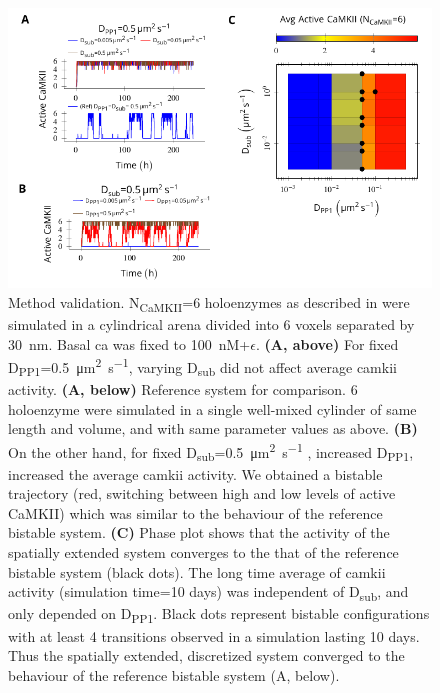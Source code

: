 \documentclass[9pt,lineno,doublespacing]{elife}
\newcommand\SUB[2]{#1\textsubscript{#2}}
\begin{document}
\begin{figure}[ht!]
    \includegraphics[width=12cm]{./PaperFigures/elifeFigure7/figure_su_long_term_effect.pdf}
    \caption{Method validation. \SUB{N}{CaMKII}=6 holoenzymes as described in
         were simulated in a cylindrical arena 
        divided into 6 voxels separated by \SI{30}{\nano\meter}. Basal \gls{ca} 
        was fixed to \SI{100}{\nano M}+$\epsilon$.  
        \textbf{(A, above)} For fixed 
        \SUB{D}{PP1}=\SI{0.5}{\micro\meter\squared\per\second}, varying
        \SUB{D}{sub} did not affect average \gls{camkii} activity. 
        \textbf{(A, below)} Reference system for comparison. 6 holoenzyme 
        were simulated in a single well-mixed cylinder of same length 
        and volume, and with same parameter values as above.
        \textbf{(B)} On the other hand, for fixed
        \SUB{D}{sub}=\SI{0.5}{\micro\meter\squared\per\second} , increased
        \SUB{D}{PP1}, increased the average \gls{camkii} activity. We obtained 
        a bistable trajectory (red, switching between high and low levels of 
        active CaMKII) which was similar to the behaviour of the reference bistable
        system. 
        \textbf{(C)} Phase plot shows that the activity of the spatially extended 
        system converges to the that of the reference bistable system (black dots). 
        The long time average of \Gls{camkii} activity (simulation time=10 days) 
        was independent of \SUB{D}{sub}, and only depended on \SUB{D}{PP1}.
        Black dots represent bistable configurations with at least 4 transitions 
        observed in a simulation lasting 10 days. Thus the spatially extended, 
        discretized system converged to the behaviour of the reference bistable
        system (A, below).
    }\label{fig:method_validation} 


\end{figure}
\end{document}
